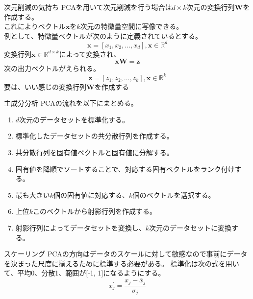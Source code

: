 \documentclass[aspectratio=169, dvipdfmx, 11pt]{beamer} %
\begin{document}
\begin{frame}{次元削減の気持ち}
    PCAを用いて次元削減を行う場合は\(d \times k\)次元の変換行列\(\bm{W}\)を作成する。 \\
    これによりベクトル\(\bm{x}\)を\(k\)次元の特徴量空間に写像できる。\\
    例として、特徴量ベクトルが次のように定義されているとする。
    \begin{equation*}
        \bm{x} = [ x_1, x_2, \ldots, x_d ], \bm{x} \in \mathbb{R}^d
    \end{equation*}
    変換行列\(\bm{x} \in \mathbb{R}^{d \times k}\)によって変換され、
    \begin{equation*}
        \bm{xW} = \bm{z}
    \end{equation*}
    次の出力ベクトルがえられる。
    \begin{equation*}
        \bm{z} = [ z_1, z_2, \ldots, z_k ], \bm{x} \in \mathbb{R}^k
    \end{equation*}
    要は、いい感じの変換行列\(\bm{W}\)を作成する
\end{frame}

\begin{frame}{主成分分析}
    PCAの流れを以下にまとめる。
    \vspace{1em}
    \begin{enumerate}
        \item \(d\)次元のデータセットを標準化する。
        \item 標準化したデータセットの共分散行列を作成する。
        \item 共分散行列を固有値ベクトルと固有値に分解する。
        \item 固有値を降順でソートすることで、対応する固有ベクトルをランク付けする。
        \item 最も大きい\(k\)個の固有値に対応する、\(k\)個のベクトルを選択する。
        \item 上位\(k\)このベクトルから射影行列を作成する。
        \item 射影行列によってデータセットを変換し、\(k\)次元のデータセットに変換する。
    \end{enumerate}
\end{frame}

\begin{frame}{スケーリング}
    PCAの方向はデータのスケールに対して敏感なので事前にデータを決まった尺度に揃えるために標準する必要がある。
    標準化は次の式を用いて、平均0、分散1、範囲が[-1, 1]になるようにする。
    \vspace{2em}
    \begin{equation*}
        x_{j}^{'} = \frac{x_j - \bar{x} _j}{\sigma_j}
    \end{equation*}
\end{frame}
\end{document}
